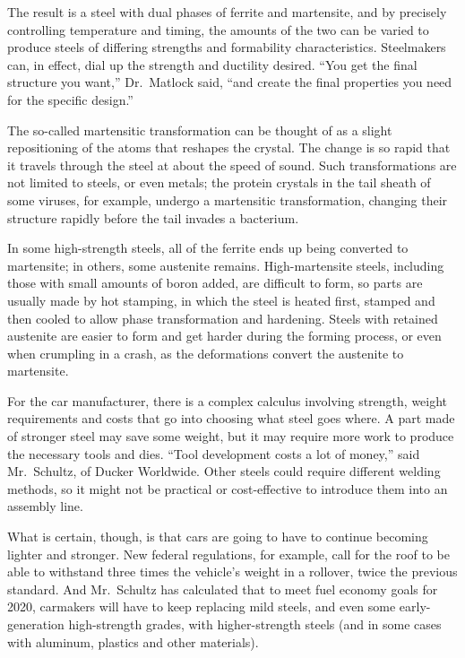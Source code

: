 ﻿\documentclass[12pt]{article}
\begin{document}
The result is a steel with dual phases of ferrite and martensite, and by precisely controlling
temperature and timing, the amounts of the two can be varied to produce steels of differing
strengths and formability characteristics. Steelmakers can, in effect, dial up the strength and
ductility desired. ``You get the final structure you want,'' Dr.~Matlock said, ``and create the
final properties you need for the specific design.''

The so-called martensitic transformation can be thought of as a slight repositioning of the atoms
that reshapes the crystal. The change is so rapid that it travels through the steel at about the
speed of sound. Such transformations are not limited to steels, or even metals; the protein crystals
in the tail sheath of some viruses, for example, undergo a martensitic transformation, changing
their structure rapidly before the tail invades a bacterium.

In some high-strength steels, all of the ferrite ends up being converted to martensite; in others,
some austenite remains. High-martensite steels, including those with small amounts of boron added,
are difficult to form, so parts are usually made by hot stamping, in which the steel is heated
first, stamped and then cooled to allow phase transformation and hardening. Steels with retained
austenite are easier to form and get harder during the forming process, or even when crumpling in a
crash, as the deformations convert the austenite to martensite.

For the car manufacturer, there is a complex calculus involving strength, weight requirements and
costs that go into choosing what steel goes where. A part made of stronger steel may save some
weight, but it may require more work to produce the necessary tools and dies. ``Tool development
costs a lot of money,'' said Mr.~Schultz, of Ducker Worldwide. Other steels could require different
welding methods, so it might not be practical or cost-effective to introduce them into an assembly
line.

What is certain, though, is that cars are going to have to continue becoming lighter and stronger.
New federal regulations, for example, call for the roof to be able to withstand three times the
vehicle's weight in a rollover, twice the previous standard. And Mr.~Schultz has calculated that to
meet fuel economy goals for 2020, carmakers will have to keep replacing mild steels, and even some
early-generation high-strength grades, with higher-strength steels (and in some cases with aluminum,
plastics and other materials).
\end{document}
